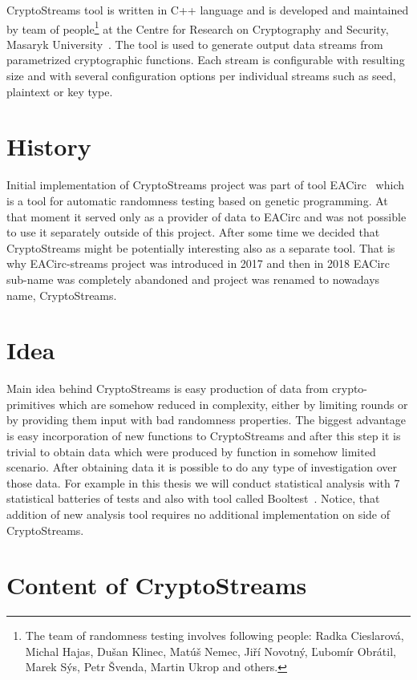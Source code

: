 \documentclass[
    digital,    %
    oneside,    %
    color,
    11pt,
    nocover,
    notable,
    nolof,
    nolot,
    final
]{fithesis3}
\begin{document}
CryptoStreams tool is written in C++ language and is developed and maintained by team of people\footnote{The team of randomness testing involves following people: Radka Cieslarová, Michal Hajas, Dušan Klinec, Matúš Nemec, Jiří Novotný, Ľubomír Obrátil, Marek Sýs, Petr Švenda, Martin Ukrop and others.} at the Centre for Research on Cryptography and Security, Masaryk University~\cite{CryptoStreams}. The tool is used to generate output data streams from parametrized cryptographic functions. Each stream is configurable with resulting size and with several configuration options per individual streams such as seed, plaintext or key type. 

\section{History}

Initial implementation of CryptoStreams project was part of tool EACirc~\cite{EACirc} which is a tool for automatic randomness testing based on genetic programming. At that moment it served only as a provider of data to EACirc and was not possible to use it separately outside of this project. After some time we decided that CryptoStreams might be potentially interesting also as a separate tool. That is why EACirc-streams project was introduced in 2017 and then in 2018 EACirc sub-name was completely abandoned and project was renamed to nowadays name, CryptoStreams.

\section{Idea}

Main idea behind CryptoStreams is easy production of data from crypto-primitives which are somehow reduced in complexity, either by limiting rounds or by providing them input with bad randomness properties. The biggest advantage is easy incorporation of new functions to CryptoStreams and after this step it is trivial to obtain data which were produced by function in somehow limited scenario. After obtaining data it is possible to do any type of investigation over those data. For example in this thesis we will conduct statistical analysis with 7 statistical batteries of tests and also with tool called Booltest~\cite{booltest-secrypt2017}. Notice, that addition of new analysis tool requires no additional implementation on side of CryptoStreams.

\section{Content of CryptoStreams}
\end{document}

